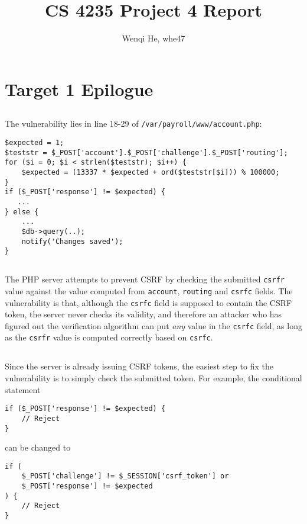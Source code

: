 \documentclass[11pt]{article}
\title{CS 4235 Project 4 Report}
\author{Wenqi He, whe47}
\begin{document}
\maketitle
\section{Target 1 Epilogue}
\subsection{}
The vulnerability lies in line 18-29 of \texttt{/var/payroll/www/account.php}:
\begin{verbatim}
$expected = 1;
$teststr = $_POST['account'].$_POST['challenge'].$_POST['routing'];
for ($i = 0; $i < strlen($teststr); $i++) {
    $expected = (13337 * $expected + ord($teststr[$i])) % 100000;
}
if ($_POST['response'] != $expected) {
   ...
} else {
    ...
    $db->query(..);
    notify('Changes saved');
}
\end{verbatim}

\subsection{}
The PHP server attempts to prevent CSRF by checking the submitted \texttt{csrfr} value against the value computed from \texttt{account}, \texttt{routing} and \texttt{csrfc} fields. The vulnerability is that, although the \texttt{csrfc} field is supposed to contain the CSRF token, the server never checks its validity, and therefore an attacker who has figured out the verification algorithm can put \textit{any} value in the \texttt{csrfc} field, as long as the \texttt{csrfr} value is computed correctly based on \texttt{csrfc}.

\subsection{}
Since the server is already issuing CSRF tokens, the easiest step to fix the vulnerability is to simply check the submitted token. For example, the conditional statement
\begin{verbatim}
if ($_POST['response'] != $expected) {
    // Reject
}
\end{verbatim}
can be changed to
\begin{verbatim}
if (
    $_POST['challenge'] != $_SESSION['csrf_token'] or 
    $_POST['response'] != $expected
) {
    // Reject
}
\end{verbatim}
\end{document}
